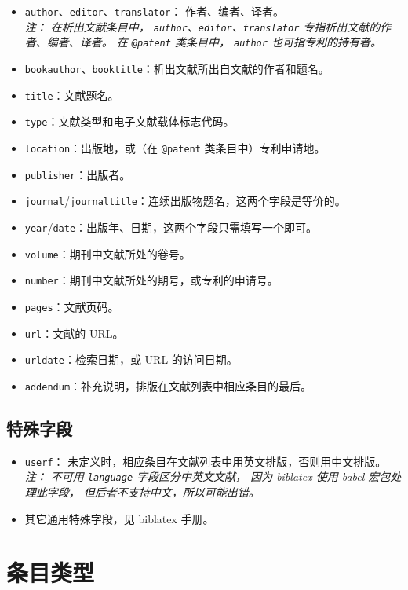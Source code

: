 \documentclass[UTF8, fancyhdr, hyperref]{ctexart}
\begin{document}
\begin{itemize}
	\item \verb|author|、\verb|editor|、\verb|translator|：
		作者、编者、译者。\\
		\emph{%
			注：
			在析出文献条目中，
			\texttt{author}、\texttt{editor}、\texttt{translator}
			专指析出文献的作者、编者、译者。
			在 \texttt{@patent} 类条目中，
			\texttt{author} 也可指专利的持有者。%
		}
	\item \verb|bookauthor|、\verb|booktitle|：析出文献所出自文献的作者和题名。
	\item \verb|title|：文献题名。
	\item \verb|type|：文献类型和电子文献载体标志代码\supercite{gbt7714-2005}。
	\item \verb|location|：出版地，或（在 \verb|@patent| 类条目中）专利申请地。
	\item \verb|publisher|：出版者。
	\item \verb|journal|/\verb|journaltitle|：连续出版物题名，这两个字段是等价的。
	\item \verb|year|/\verb|date|：出版年、日期，这两个字段只需填写一个即可。
	\item \verb|volume|：期刊中文献所处的卷号。
	\item \verb|number|：期刊中文献所处的期号，或专利的申请号。
	\item \verb|pages|：文献页码。
	\item \verb|url|：文献的 URL。
	\item \verb|urldate|：检索日期，或 URL 的访问日期。
	\item \verb|addendum|：补充说明，排版在文献列表中相应条目的最后。
\end{itemize}

\subsection{特殊字段}

\begin{itemize}
	\item \verb|userf|：
		未定义时，相应条目在文献列表中用英文排版，否则用中文排版。\\
		\emph{%
			注：
			不可用 \texttt{language} 字段区分中英文文献，
			因为 biblatex 使用 babel\supercite{babel} 宏包处理此字段，
			但后者不支持中文，所以可能出错。%
		}
	\item 其它通用特殊字段，见 biblatex 手册\supercite{biblatex}。
\end{itemize}

\section{条目类型}
\end{document}
